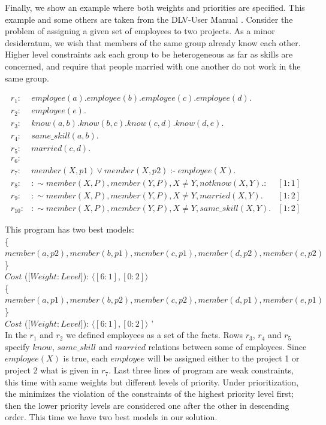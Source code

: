 \documentclass[14pt,a4paper, titlepage]{article}
\DeclareMathOperator{\leftimpl}{:-}
\begin{document}
Finally, we show an example where both weights and priorities are specified. This example and some others are taken from the DLV-User Manual \cite{dlvum}. Consider the problem of assigning a given set of employees to two projects. As a minor desideratum, we wish that members of the same group already know each other. Higher level constraints ask each group to be heterogeneous as far as skills are concerned, and require that people married with one another do not work in the same group.
\begin{exmp}
\begin{align*}
r_1\colon& \mathit{employee}(a). \mathit{employee}(b). \mathit{employee}(c). \mathit{employee(d)}. \\
r_2\colon& \mathit{employee}(e). \\
r_3\colon& \mathit{know}(a,b). \mathit{know}(b,c). \mathit{know}(c,d). \mathit{know}(d,e). \\
r_4\colon& \mathit{same\_skill}(a,b). \\
r_5\colon& \mathit{married(c,d)}. \\
r_6\colon&  \\ 
r_7\colon& \mathit{member}(X,p1) \vee \mathit{member}(X,p2) \leftimpl \mathit{employee}(X).\\
r_8\colon& : \sim \mathit{member}(X,P), \mathit{member}(Y,P), X \neq Y, \mathit{not} \mathit{know(X,Y)}. \colon& [1:1] \\
r_{9}\colon& : \sim  \mathit{member}(X,P), \mathit{member}(Y,P), X \neq Y, \mathit{marrie}d(X,Y). & [1:2]\\
r_{10}\colon& : \sim member(X,P), member(Y,P), X \neq Y, same\_skill(X,Y). & [1:2] 
\end{align*}
\end{exmp}
This program has two best models:
\\ \{$\mathit{member}(a,p2), \mathit{member}(b,p1), \mathit{member}(c,p1), \mathit{member}(d,p2), \mathit{member}(e,p2)$\}
\\$\mathit{Cost}$ ($[ \mathit{Weight:Level]}$): $ \langle [6:1],[0:2] \rangle $
\\ \{$\mathit{member}(a,p1), \mathit{member}(b,p2), \mathit{member}(c,p2), \mathit{member}(d,p1), \mathit{member}(e,p1)$\}
\\$\mathit{Cost}$ ($[ \mathit{Weight:Level]}$): $ \langle [6:1],[0:2] \rangle $ '\\

In the $r_1$ and $r_2$ we defined employees as a set of the facts. Rows $r_3$, $r_4$ and $r_5$ specify $\mathit{know}$, $\mathit{same\_skill}$ and $\mathit{married}$ relations between some of employees. Since $\mathit{employee}(X)$ is true, each $\mathit{employee}$ will be assigned either to the project 1 or project 2 what is given in $r_7$. Last three lines of program are weak constraints, this time with same weights but different levels of priority. Under prioritization, the \dlvhex{} minimizes the violation of the constraints of the highest priority level first; then the lower priority levels are considered one after the other in descending order. This time we have two best models in our solution.     
\end{document}
